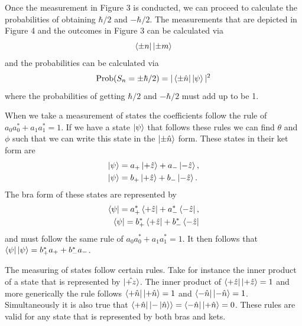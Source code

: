 \documentclass[twocolumn]{article}
\begin{document}
\newline
Once the measurement in Figure 3 is conducted, we can proceed to calculate the probabilities of obtaining $\hbar/2$ and $-\hbar/2$. The measurements that are depicted in Figure 4 and the outcomes in Figure 3 can be calculated via
\begin{equation} \label{eq:1}
\bra{\pm n}\ket{\pm m}
\end{equation}
and the probabilities can be calculated via
\begin{equation} \label{eq:2}
\text{Prob}(S_n=\pm \hbar/2)=|\bra{\pm\hat{n}}\ket{\psi}|^2
\end{equation}
where the probabilities of getting $\hbar/2$ and $-\hbar/2$ must add up to be 1. 

When we take a measurement of states the coefficients follow the rule of $a_0a_0^*+a_1a_1^*=1$. If we have a state $\ket{\psi}$ that follows these rules we can find $\theta$ and $\phi$ such that we can write this state in the $\ket{\pm\hat{n}}$ form. These states in their ket form are
\begin{align} \label{eq:3}
\ket{\psi}&=a_{+}\ket{+\hat{z}}+a_{-}\ket{-\hat{z}}, \\
\ket{\psi}&=b_{+}\ket{+\hat{z}}+b_{-}\ket{-\hat{z}}. \nonumber
\end{align}
The bra form of these states are represented by
\begin{align}\label{eq:4}
\bra{\psi}=a_{+}^*\bra{+\hat{z}}+a_{-}^*\bra{-\hat{z}}, \\
\bra{\psi}=b_{+}^*\bra{+\hat{z}}+b_{-}^*\bra{-\hat{z}} \nonumber
\end{align}
and must follow the same rule of $a_0a_0^*+a_1a_1^*=1$. It then follows that $\bra{\psi}\ket{\psi}=b_{+}^*a_{+}+b_{-}^*a_{-}$.

The measuring of states follow certain rules. Take for instance the inner product of a state that is represented by $\ket{\hat{+z}}$. The inner product of $\bra{+\hat{z}}\ket{+\hat{z}}=1$ and more generically the rule follows $\bra{+\hat{n}}\ket{+\hat{n}}=1$ and $\bra{-\hat{n}}\ket{-\hat{n}}=1$. Simultaneously it is also true that $\bra{+\hat{n}}\ket{-\ket{\hat{n}}}=\bra{-\hat{n}}\ket{+\hat{n}}=0$. These rules are valid for any state that is represented by both bras and kets.
\end{document}
